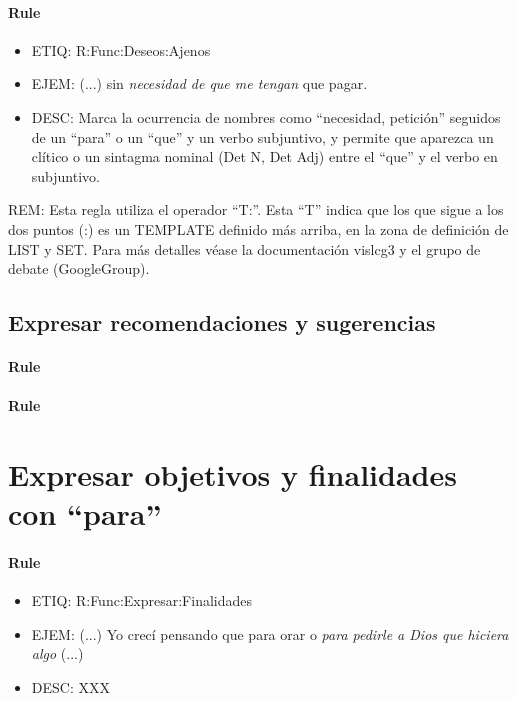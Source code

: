 \documentclass[11pt]{report}
\begin{document}
\paragraph*{Rule}
\begin{itemize}
\item ETIQ: R:Func:Deseos:Ajenos
\item EJEM: (...) sin \emph{necesidad de que me tengan} que pagar.
\item DESC: Marca la ocurrencia de nombres como ``necesidad, petición'' seguidos de un ``para'' o un ``que'' y un verbo subjuntivo, y permite que aparezca un clítico o un sintagma nominal (Det N, Det Adj) entre el ``que'' y el verbo en subjuntivo.
\end{itemize}

REM: Esta regla utiliza el operador ``T:''. Esta ``T'' indica que los que sigue a los dos puntos (:) es un TEMPLATE definido más arriba, en la zona de definición de LIST y SET. Para más detalles véase la documentación vislcg3 y el grupo de debate (GoogleGroup).
\subsection{Expresar recomendaciones y sugerencias}
\paragraph*{Rule}
\paragraph*{Rule}
\section{Expresar objetivos y finalidades con ``para''}
\paragraph*{Rule}
\begin{itemize}
\item ETIQ: R:Func:Expresar:Finalidades
\item EJEM: (...) Yo crecí pensando que para orar o \emph{para pedirle a Dios que hiciera algo} (...)
\item DESC: XXX
\end{itemize}
\end{document}
